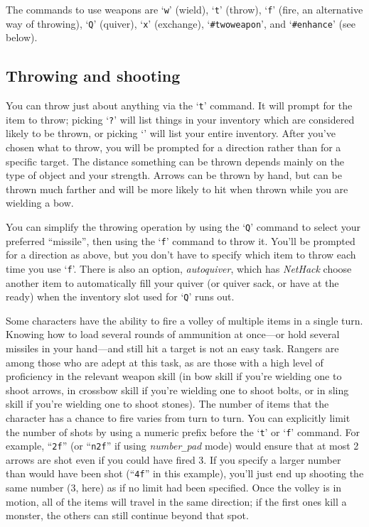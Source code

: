 The commands to use weapons are `{\tt w}' (wield), `{\tt t}' (throw),
`{\tt f}' (fire, an alternative way of throwing), `{\tt Q}' (quiver),
`{\tt x}' (exchange), `{\tt \#twoweapon}', and `{\tt \#enhance}' (see below).

\subsection*{Throwing and shooting}

You can throw just about anything via the `{\tt t}' command.  It will prompt
for the item to throw; picking `{\tt ?}' will list things in your inventory
which are considered likely to be thrown, or picking `{\tt *}' will list
your entire inventory.  After you've chosen what to throw, you will
be prompted for a direction rather than for a specific target.  The
distance something can be thrown depends mainly on the type of object
and your strength.  Arrows can be thrown by hand, but can be thrown
much farther and will be more likely to hit when thrown while you are
wielding a bow.

You can simplify the throwing operation by using the `{\tt Q}' command to
select your preferred ``missile'', then using the `{\tt f}' command to
throw it.  You'll be prompted for a direction as above, but you don't
have to specify which item to throw each time you use `{\tt f}'.  There is
also an option,
{\it autoquiver},
which has {\it NetHack\/} choose another item to automatically fill your
quiver (or quiver sack, or have at the ready) when the inventory slot used
for `{\tt Q}' runs out.

Some characters have the ability to fire a volley of multiple items in a
single turn.  Knowing how to load several rounds of ammunition at
once---or hold several missiles in your hand---and still hit a
target is not an easy task.  Rangers are among those who are adept
at this task, as are those with a high level of proficiency in the
relevant weapon skill (in bow skill if you're wielding one to
shoot arrows, in crossbow skill if you're wielding one to shoot bolts,
or in sling skill if you're wielding one to shoot stones).
The number of items that the character has a chance to fire varies from
turn to turn.  You can explicitly limit the number of shots by using a
numeric prefix before the `{\tt t}' or `{\tt f}' command.
For example, ``{\tt 2f}'' (or ``{\tt n2f}'' if using
{\it number\verb+_+pad\/}
mode) would ensure that at most 2 arrows are shot
even if you could have fired 3.  If you specify
a larger number than would have been shot (``{\tt 4f}'' in this example),
you'll just end up shooting the same number (3, here) as if no limit
had been specified.  Once the volley is in motion, all of the items
will travel in the same direction; if the first ones kill a monster,
the others can still continue beyond that spot.

